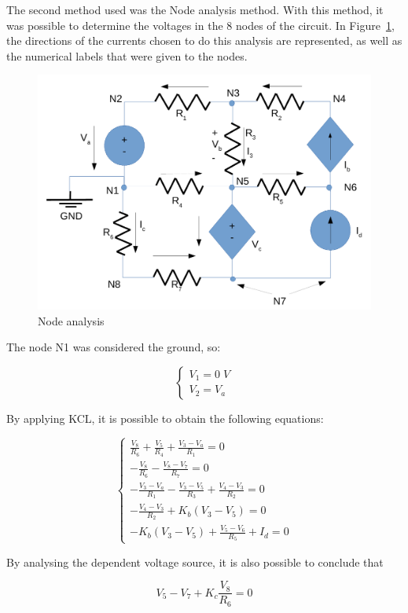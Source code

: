 The second method used was the Node analysis method. With this method, it was possible to determine the voltages in the 8 nodes of the circuit. In Figure~\ref{node_fig}, the directions of the currents chosen to do this analysis are represented, as well as the numerical labels that were given to the nodes.

\begin{figure}[H]
  \centering
  \includegraphics[width=0.5\linewidth]{node.pdf}
  \caption{Node analysis}
  \label{node_fig}
\end{figure}

The node N1 was considered the ground, so:

\begin{equation}
  \begin{cases}
    V_1 = 0 \; V \\
    V_2 = V_a
  \end{cases}
\end{equation}

By applying KCL, it is possible to obtain the following equations:

\begin{equation}
  \begin{cases}
    \frac{V_8}{R_6} + \frac{V_5}{R_4} + \frac{V_3-V_a}{R_1} = 0 \\
    -\frac{V_8}{R_6} - \frac{V_8-V_7}{R_7} = 0 \\
    -\frac{V_3-V_a}{R_1} - \frac{V_3-V_5}{R_3} + \frac{V_4-V_3}{R_2} = 0 \\
    -\frac{V_4-V_3}{R_2} + K_b(V_3-V_5) = 0 \\
    -K_b(V_3-V_5) + \frac{V_5-V_6}{R_5} + I_d = 0
  \end{cases}
\end{equation}

By analysing the dependent voltage source, it is also possible to conclude that

\begin{equation}
  V_5 - V_7 + K_c\frac{V_8}{R_6} = 0
\end{equation}

